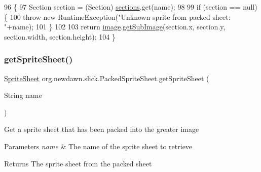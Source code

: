 \begin{DoxyCode}
96                                         \{
97         Section section = (Section) \mbox{\hyperlink{classorg_1_1newdawn_1_1slick_1_1_packed_sprite_sheet_a7585e251934ce67d5c2a69448e461f29}{sections}}.get(name);
98         
99         \textcolor{keywordflow}{if} (section == null) \{
100             \textcolor{keywordflow}{throw} \textcolor{keyword}{new} RuntimeException(\textcolor{stringliteral}{"Unknown sprite from packed sheet: "}+name);
101         \}
102         
103         \textcolor{keywordflow}{return} \mbox{\hyperlink{classorg_1_1newdawn_1_1slick_1_1_packed_sprite_sheet_a3bfe1d01086f84a9f9bdacbfb2f5ceba}{image}}.\mbox{\hyperlink{classorg_1_1newdawn_1_1slick_1_1_image_a2ccb3bbdda674f9efdec614a54e31e32}{getSubImage}}(section.x, section.y, section.width, section.height);
104     \}
\end{DoxyCode}
\mbox{\label{classorg_1_1newdawn_1_1slick_1_1_packed_sprite_sheet_ad7e059c2e511ac079d6823158e1c6833}} 
\subsubsection{\texorpdfstring{get\+Sprite\+Sheet()}{getSpriteSheet()}}
{\footnotesize\ttfamily \mbox{\hyperlink{classorg_1_1newdawn_1_1slick_1_1_sprite_sheet}{Sprite\+Sheet}} org.\+newdawn.\+slick.\+Packed\+Sprite\+Sheet.\+get\+Sprite\+Sheet (\begin{DoxyParamCaption}\item[{String}]{name }\end{DoxyParamCaption})\hspace{0.3cm}{\ttfamily [inline]}}

Get a sprite sheet that has been packed into the greater image


\begin{DoxyParams}{Parameters}
{\em name} & The name of the sprite sheet to retrieve \\
\hline
\end{DoxyParams}
\begin{DoxyReturn}{Returns}
The sprite sheet from the packed sheet 
\end{DoxyReturn}

